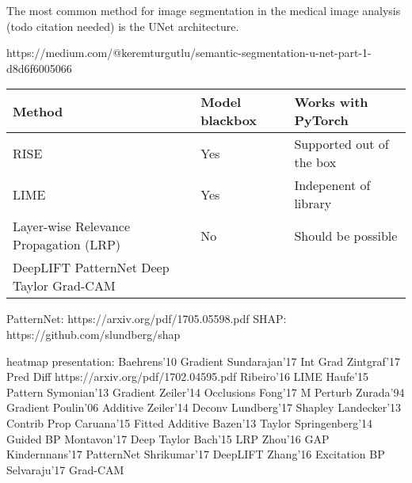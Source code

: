 The most common method for image segmentation in the medical image analysis (todo citation needed) is the UNet\cite{todo} architecture.



https://medium.com/@keremturgutlu/semantic-segmentation-u-net-part-1-d8d6f6005066


\begin{tabularx}{\textwidth}{|l|l|l|}
\hline
\textbf{Method} & \textbf{Model blackbox} & \textbf{Works with PyTorch} \\ \hline
RISE & Yes & Supported out of the box \\ \hline
LIME & Yes & Indepenent of library \\ \hline
Layer-wise Relevance Propagation (LRP) & No & Should be possible  \\ \hline
DeepLIFT
PatternNet
Deep Taylor
Grad-CAM
\hline
\end{tabularx}

PatternNet: https://arxiv.org/pdf/1705.05598.pdf
SHAP: https://github.com/slundberg/shap

heatmap presentation:
Baehrens'10 Gradient
Sundarajan'17 Int Grad
Zintgraf'17 Pred Diff  https://arxiv.org/pdf/1702.04595.pdf
Ribeiro'16 LIME
Haufe'15 Pattern
Symonian'13 Gradient
Zeiler'14 Occlusions
Fong'17 M Perturb
Zurada'94 Gradient
Poulin'06 Additive
Zeiler'14 Deconv
Lundberg'17 Shapley
Landecker'13 Contrib Prop
Caruana'15 Fitted Additive
Bazen'13 Taylor
Springenberg'14 Guided BP
Montavon'17 Deep Taylor
Bach'15 LRP
Zhou'16 GAP
Kindernnans'17 PatternNet
Shrikumar'17 DeepLIFT
Zhang'16 Excitation BP
Selvaraju'17 Grad-CAM
